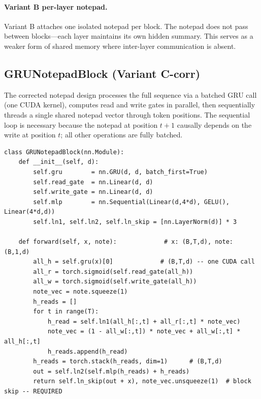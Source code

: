 \documentclass[11pt,a4paper]{article}
\begin{document}
\paragraph{Variant B per-layer notepad.}  Variant B attaches one isolated
notepad per block.  The notepad does not pass between blocks---each layer
maintains its own hidden summary.  This serves as a weaker form of shared
memory where inter-layer communication is absent.

\subsection{GRUNotepadBlock (Variant C-corr)}
\label{sec:notepad_arch}

The corrected notepad design processes the full sequence via a batched GRU
call (one CUDA kernel), computes read and write gates in parallel, then
sequentially threads a single shared notepad vector through token positions.
The sequential loop is necessary because the notepad at position $t{+}1$
causally depends on the write at position $t$; all other operations are
fully batched.

\begin{lstlisting}[caption={GRUNotepadBlock forward pass (corrected design).}]
class GRUNotepadBlock(nn.Module):
    def __init__(self, d):
        self.gru        = nn.GRU(d, d, batch_first=True)
        self.read_gate  = nn.Linear(d, d)
        self.write_gate = nn.Linear(d, d)
        self.mlp        = nn.Sequential(Linear(d,4*d), GELU(), Linear(4*d,d))
        self.ln1, self.ln2, self.ln_skip = [nn.LayerNorm(d)] * 3

    def forward(self, x, note):             # x: (B,T,d), note: (B,1,d)
        all_h = self.gru(x)[0]             # (B,T,d) -- one CUDA call
        all_r = torch.sigmoid(self.read_gate(all_h))
        all_w = torch.sigmoid(self.write_gate(all_h))
        note_vec = note.squeeze(1)
        h_reads = []
        for t in range(T):
            h_read = self.ln1(all_h[:,t] + all_r[:,t] * note_vec)
            note_vec = (1 - all_w[:,t]) * note_vec + all_w[:,t] * all_h[:,t]
            h_reads.append(h_read)
        h_reads = torch.stack(h_reads, dim=1)      # (B,T,d)
        out = self.ln2(self.mlp(h_reads) + h_reads)
        return self.ln_skip(out + x), note_vec.unsqueeze(1)  # block skip -- REQUIRED
\end{lstlisting}
\end{document}
